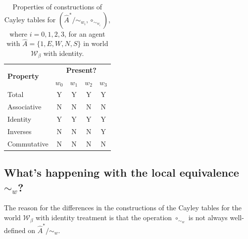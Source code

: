 \begin{table}[H]
\centering
\begin{tabular}{lcccc}
    \hline
    \multirow{2}{*}{\textbf{Property}} & \multicolumn{4}{c}{\textbf{Present?}} \\
            & $w_{0}$   & $w_{1}$   & $w_{2}$   & $w_{3}$ \\
    \hline
    Total   & Y         & Y         & Y         & Y \\
    Associative & N     & N         & N         & N \\
    Identity & Y        & Y         & Y         & Y \\
    Inverses & N        & N         & N         & Y \\
    \hline
    Commutative & N     & N         & N         & N \\
\end{tabular}
\caption{
Properties of constructions of Cayley tables for $(\hat{A}^{*}/\sim_{w_{i}}, \circ_{\sim_{w_{i}}})$, where $i = 0, 1, 2, 3$, for an agent with $\hat{A} = \{1, E, W, N, S \}$ in world $\mathscr{W}_{\beta}$ with identity.
}
\label{tab:W_beta_identity_local_algebra_properties}
\end{table}




\subsection{What's happening with the local equivalence $\sim_{w}$?}

The reason for the differences in the constructions of the Cayley tables for the world $\mathscr{W}_{\beta}$ with identity treatment is that the operation $\circ_{\sim_{w}}$ is not always well-defined on $\hat{A}^{*}/\sim_{w}$.

